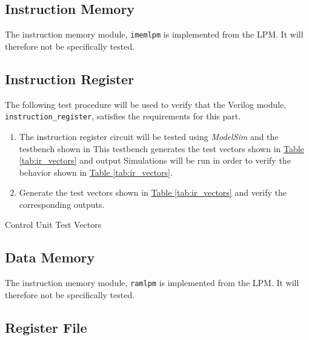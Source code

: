 
\subsection{Instruction Memory} %
\label{sub:instruction_memory}

The instruction memory module, \verb|imemlpm| is implemented from the LPM.
It will therefore not be specifically tested.


\subsection{Instruction Register} %
\label{sub:instruction_register}

The following test procedure will be used to verify that the Verilog module, \verb|instruction_register|, satisfies the requirements for this part.

\begin{enumerate}
    \item The instruction register circuit will be tested using \emph{ModelSim} and the testbench shown in %
    This testbench generates the test vectors shown in \hyperref[tab:ir_vectors]{Table \ref*{tab:ir_vectors}} and output %
    Simulations will be run in order to verify the behavior shown in \hyperref[tab:ir_vectors]{Table \ref*{tab:ir_vectors}}.
    \item Generate the test vectors shown in \hyperref[tab:ir_vectors]{Table \ref*{tab:ir_vectors}}
    and verify the corresponding outputs.
\end{enumerate}

\begin{table}[htbp]
    \centering
    \caption{Control Unit Test Vectors\label{tab:ir_vectors}}
\end{table}


\subsection{Data Memory} %
\label{sub:data_memory}

The instruction memory module, \verb|ramlpm| is implemented from the LPM.
It will therefore not be specifically tested.

\subsection{Register File} %
\label{sub:register_file}

